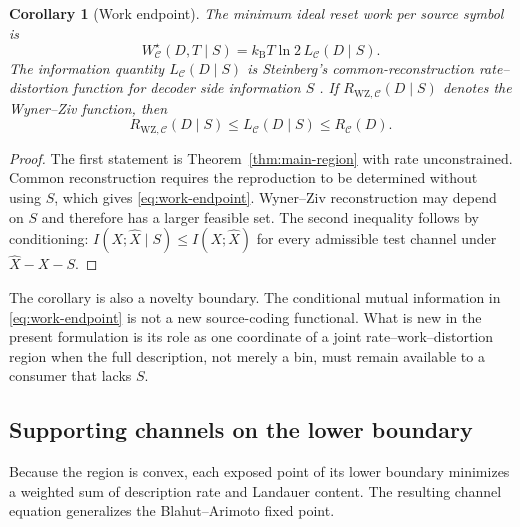 \documentclass[letterpaper,onecolumn]{IEEEtran}
\newtheorem{corollary}{Corollary}
\theoremstyle{definition}
\theoremstyle{remark}
\newcommand{\cC}{\mathcal{C}}
\newcommand{\hX}{\widehat{X}}
\newcommand{\1}{\mathbf{1}}
\newcommand{\kb}{k_{\mathrm B}}
\begin{document}
\begin{corollary}[Work endpoint]\label{cor:cr}
The minimum ideal reset work per source symbol is
\begin{equation}
 W_{\cC}^{\star}(D,T\mid S)
 =\kb T\ln2\,L_{\cC}(D\mid S).
 \label{eq:work-endpoint-physical}
\end{equation}
The information quantity $L_{\cC}(D\mid S)$ is Steinberg's
common-reconstruction rate--distortion function for decoder side information
$S$ \cite{steinberg2009}. If $R_{\mathrm{WZ},\cC}(D\mid S)$ denotes the
Wyner--Ziv function, then
\begin{equation}
 R_{\mathrm{WZ},\cC}(D\mid S)
 \le L_{\cC}(D\mid S)
 \le R_{\cC}(D).
 \label{eq:sandwich}
\end{equation}
\end{corollary}

\begin{proof}
The first statement is Theorem~\ref{thm:main-region} with rate unconstrained.
Common reconstruction requires the reproduction to be determined without using
$S$, which gives \eqref{eq:work-endpoint}. Wyner--Ziv reconstruction may depend
on $S$ and therefore has a larger feasible set. The second inequality follows
by conditioning: $I(X;\hX\mid S)\le I(X;\hX)$ for every admissible test channel
under $\hX-X-S$.
\end{proof}

The corollary is also a novelty boundary. The conditional mutual information in
\eqref{eq:work-endpoint} is not a new source-coding functional. What is new in
the present formulation is its role as one coordinate of a joint
rate--work--distortion region when the full description, not merely a bin, must
remain available to a consumer that lacks $S$.

\subsection{Supporting channels on the lower boundary}

Because the region is convex, each exposed point of its lower boundary minimizes
a weighted sum of description rate and Landauer content. The resulting channel
equation generalizes the Blahut--Arimoto fixed point.
\end{document}
